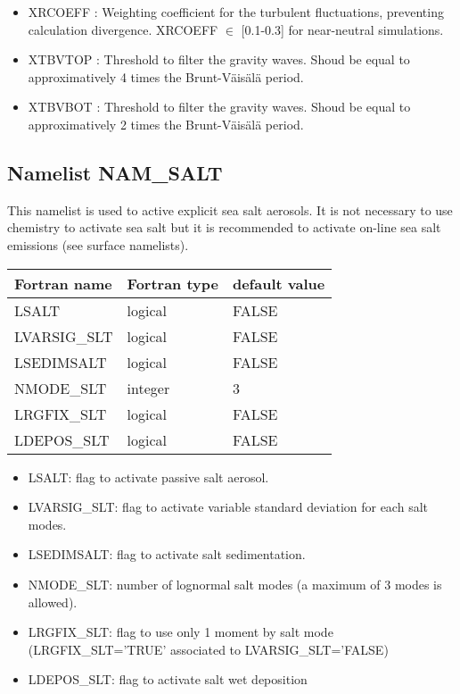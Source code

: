 \begin{itemize}
\item XRCOEFF : Weighting coefficient for the turbulent fluctuations, preventing calculation divergence. XRCOEFF $\in$ [0.1-0.3] for near-neutral simulations.

\item XTBVTOP : Threshold to filter the gravity waves. Shoud be equal to approximatively 4 times the Brunt-V{\"a}is{\"a}l{\"a} period.

\item XTBVBOT : Threshold to filter the gravity waves. Shoud be equal to approximatively 2 times the Brunt-V{\"a}is{\"a}l{\"a} period.
  
\end{itemize}
\subsection{Namelist NAM\_SALT }
%
This namelist is used to active explicit sea salt aerosols. 
It is not necessary to use chemistry to activate sea salt but it is recommended to activate on-line sea salt emissions (see surface namelists).


\begin{longtable} {|p{}|p{}|p{}|}
\hline
Fortran name &  Fortran type & default value \\
\hline 
\endhead
\hline
\endfoot
LSALT       & logical  & FALSE  \\
LVARSIG\_SLT& logical  & FALSE  \\
LSEDIMSALT  & logical  & FALSE  \\
NMODE\_SLT  & integer  &  3  \\
LRGFIX\_SLT & logical  & FALSE  \\
LDEPOS\_SLT & logical  & FALSE  \\
\end{longtable}

\begin{itemize}
\item LSALT: flag to activate passive salt aerosol.
\item LVARSIG\_SLT: flag to activate variable standard deviation for each salt modes.
\item LSEDIMSALT: flag to activate salt sedimentation.
\item  NMODE\_SLT: number of lognormal salt modes (a maximum of 3 modes is allowed).
\item LRGFIX\_SLT: flag to use only 1 moment by salt mode (LRGFIX\_SLT='TRUE' associated to LVARSIG\_SLT='FALSE)
\item LDEPOS\_SLT: flag to activate salt wet deposition  
\end{itemize}
